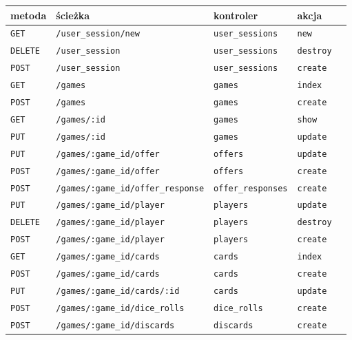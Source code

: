 \documentclass[11pt,twoside]{report}
\begin{document}
\begin{table}[ht]
  \centering
  \begin{tabular}{|l|l|l|l|l|}
    \hline
    \textbf{metoda} & \textbf{ścieżka} & \textbf{kontroler} & \textbf{akcja} \\ \hline
    \texttt{GET} & \texttt{/user\_session/new} & \texttt{user\_sessions} & \texttt{new} \\
    \texttt{DELETE} & \texttt{/user\_session} & \texttt{user\_sessions} & \texttt{destroy} \\
    \texttt{POST} & \texttt{/user\_session} & \texttt{user\_sessions} & \texttt{create} \\
    \texttt{GET} & \texttt{/games} & \texttt{games} & \texttt{index} \\
    \texttt{POST} & \texttt{/games} & \texttt{games} & \texttt{create} \\
    \texttt{GET} & \texttt{/games/:id} & \texttt{games} & \texttt{show} \\
    \texttt{PUT} & \texttt{/games/:id} & \texttt{games} & \texttt{update} \\
    \texttt{PUT} & \texttt{/games/:game\_id/offer} & \texttt{offers} & \texttt{update} \\
    \texttt{POST} & \texttt{/games/:game\_id/offer} & \texttt{offers} & \texttt{create} \\
    \texttt{POST} & \texttt{/games/:game\_id/offer\_response} & \texttt{offer\_responses} & \texttt{create} \\
    \texttt{PUT} & \texttt{/games/:game\_id/player} & \texttt{players} & \texttt{update} \\
    \texttt{DELETE} & \texttt{/games/:game\_id/player} & \texttt{players} & \texttt{destroy} \\
    \texttt{POST} & \texttt{/games/:game\_id/player} & \texttt{players} & \texttt{create} \\
    \texttt{GET} & \texttt{/games/:game\_id/cards} & \texttt{cards} & \texttt{index} \\
    \texttt{POST} & \texttt{/games/:game\_id/cards} & \texttt{cards} & \texttt{create} \\
    \texttt{PUT} & \texttt{/games/:game\_id/cards/:id} & \texttt{cards} & \texttt{update} \\
    \texttt{POST} & \texttt{/games/:game\_id/dice\_rolls} & \texttt{dice\_rolls} & \texttt{create} \\
    \texttt{POST} & \texttt{/games/:game\_id/discards} & \texttt{discards} & \texttt{create} \\

\end{tabular}
\end{table}
\end{document}
